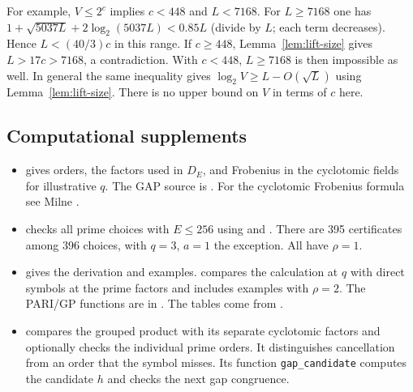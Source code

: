 \documentclass[11pt]{article}
\begin{document}
For example, $V\le2^c$ implies $c<448$ and $L<7168$.
For $L\ge7168$ one has
$1+\sqrt{5037L}+2\log_2(5037L)<0.85L$ (divide by $L$;
each term decreases). Hence $L<(40/3)c$ in this range.
If $c\ge448$, Lemma~\ref{lem:lift-size} gives $L>17c>7168$,
a contradiction. With $c<448$, $L\ge7168$ is then impossible as well.
In general the same inequality gives $\log_2 V\ge L-O(\sqrt L)$
using Lemma~\ref{lem:lift-size}. There is no upper bound on $V$
in terms of $c$ here.

\subsection{Computational supplements}

\begin{itemize}
\item {} gives orders, the factors used in $D_E$,
and Frobenius in the cyclotomic fields for illustrative $q$.
The GAP source is . For the cyclotomic
Frobenius formula see Milne \cite{MilneANT}.
\item {} checks all prime choices with
$E\le256$ using  and
. There are 395 certificates among
396 choices, with $q=3$, $a=1$ the exception. All have $\rho=1$.
\item {} gives the derivation and examples.
 compares the calculation at $q$
with direct symbols at the prime factors and includes examples
with $\rho=2$. The PARI/GP functions are in
. The tables come from
.
\item {} compares the grouped
product with its separate cyclotomic factors and optionally checks
the individual prime orders. It distinguishes cancellation from
an order that the symbol misses. Its function \texttt{gap\_candidate}
computes the candidate $h$ and checks the next gap congruence.
\end{itemize}
\end{document}
